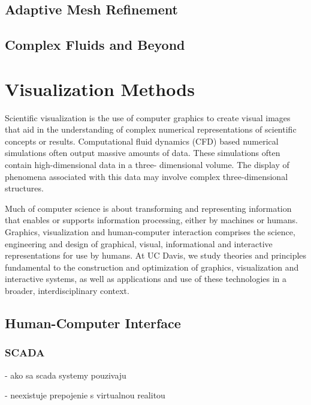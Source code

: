 \subsection{Adaptive Mesh Refinement}

\subsection{Complex Fluids and Beyond}


\section{Visualization Methods}

Scientific visualization is the use of computer graphics to create visual images that aid in the understanding of complex numerical representations of scientific concepts or results. Computational fluid dynamics (CFD) based numerical simulations often output massive amounts of data. These simulations often contain high-dimensional data in a three- dimensional volume. The display of phenomena associated with this data may involve complex three-dimensional structures.
%

Much of computer science is about transforming and representing information that enables or supports information processing, either by machines or humans. Graphics, visualization and human-computer interaction comprises the science, engineering and design of graphical, visual, informational and interactive representations for use by humans. At UC Davis, we study theories and principles fundamental to the construction and optimization of graphics, visualization and interactive systems, as well as applications and use of these technologies in a broader, interdisciplinary context.
%

\subsection{Human-Computer Interface}

\subsubsection{SCADA}

- ako sa scada systemy pouzivaju

- neexistuje prepojenie s virtualnou realitou

